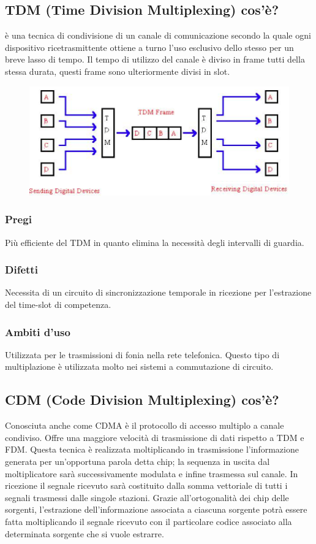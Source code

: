\subsection{TDM (Time Division Multiplexing) cos'è?}
è una tecnica di condivisione di un canale di comunicazione secondo la quale ogni dispositivo ricetrasmittente ottiene a turno l'uso esclusivo dello stesso per un breve lasso di tempo. Il tempo di utilizzo del canale è diviso in frame tutti della stessa durata, questi frame sono ulteriormente divisi in slot.

\begin{figure}[H]
\centering
\includegraphics[scale=0.5]{res/img/11_TDM.png}
\end{figure} 

\subsubsection{Pregi}
Più efficiente del TDM in quanto elimina la necessità degli intervalli di guardia.

\subsubsection{Difetti}
Necessita di un circuito di sincronizzazione temporale in ricezione per l'estrazione del time-slot di competenza.

\subsubsection{Ambiti d'uso}
Utilizzata per le trasmissioni di fonia nella rete telefonica. Questo tipo di multiplazione è utilizzata molto nei sistemi a commutazione di circuito.

\subsection{CDM (Code Division Multiplexing) cos'è?}
Conosciuta anche come CDMA è il protocollo di accesso multiplo a canale condiviso. Offre una maggiore velocità di trasmissione di dati rispetto a TDM e FDM.
Questa tecnica è realizzata moltiplicando in trasmissione l'informazione generata per un'opportuna parola detta chip; la sequenza in uscita dal moltiplicatore sarà successivamente modulata e infine trasmessa sul canale.
In ricezione il segnale ricevuto sarà costituito dalla somma vettoriale di tutti i segnali trasmessi dalle singole stazioni. Grazie all'ortogonalità dei chip delle sorgenti, l'estrazione dell'informazione associata a ciascuna sorgente potrà essere fatta moltiplicando il segnale ricevuto con il particolare codice associato alla determinata sorgente che si vuole estrarre.


